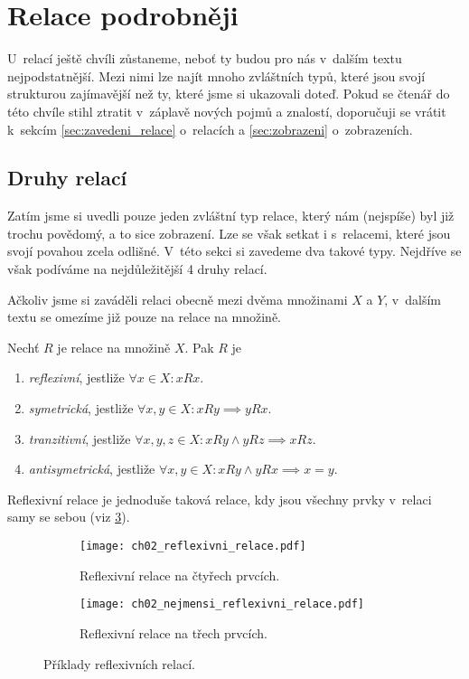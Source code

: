 \section{Relace podrobněji}\label{sec:relace_podrobneji}
U~relací ještě chvíli zůstaneme, neboť ty budou pro nás v~dalším textu nejpodstatnější. Mezi nimi lze najít mnoho zvláštních typů, které jsou svojí strukturou zajímavější než ty, které jsme si ukazovali doteď. Pokud se čtenář do této chvíle stihl ztratit v~záplavě nových pojmů a znalostí, doporučuji se vrátit k~sekcím \ref{sec:zavedeni_relace} o~relacích a \ref{sec:zobrazeni} o~zobrazeních.

\subsection{Druhy relací}\label{subsec:druhy_relaci}
Zatím jsme si uvedli pouze jeden zvláštní typ relace, který nám (nejspíše) byl již trochu povědomý, a to sice zobrazení. Lze se však setkat i s~relacemi, které jsou svojí povahou zcela odlišné. V~této sekci si zavedeme dva takové typy. Nejdříve se však podíváme na nejdůležitější 4 druhy relací.\par
Ačkoliv jsme si zaváděli relaci obecně mezi dvěma množinami $X$ a $Y$, v~dalším textu se omezíme již pouze na relace na množině.
\begin{definition}\label{def:dulezite_druhy_relaci}
    Nechť $R$ je relace na množině $X$. Pak $R$ je
    \begin{enumerate}[label=(\roman*)]
        \item \emph{reflexivní}, jestliže $\forall x\in X: xRx$.
        \item \emph{symetrická}, jestliže $\forall x,y\in X: xRy \implies yRx$.
        \item \emph{tranzitivní}, jestliže $\forall x,y,z\in X: xRy \land yRz \implies xRz$.
        \item \emph{antisymetrická}, jestliže $\forall x,y\in X: xRy \land yRx \implies x=y$.
    \end{enumerate}
\end{definition}
Reflexivní relace je jednoduše taková relace, kdy jsou všechny prvky v~relaci samy se sebou (viz \ref{fig:priklady_reflexivnich_relaci}).
\begin{figure}[H]
    \centering
    \begin{subfigure}{6cm}
        \centering
        \texttt{[image: ch02\_reflexivni\_relace.pdf]}
        \caption{Reflexivní relace na čtyřech prvcích.}
        \label{subfig:reflexivni_relace}
    \end{subfigure}
    \quad
    \begin{subfigure}{6cm}
        \centering
        \texttt{[image: ch02\_nejmensi\_reflexivni\_relace.pdf]}
        \caption{Reflexivní relace na třech prvcích.}
        \label{subfig:nejmensi_reflexivni_relace}
    \end{subfigure}
    \caption{Příklady reflexivních relací.}
    \label{fig:priklady_reflexivnich_relaci}
\end{figure}
